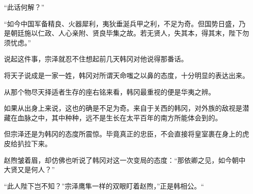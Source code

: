 “此话何解？”

“如今中国军备精良、火器犀利，夷狄垂涎兵甲之利，不足为奇。但国势日盛，乃是朝廷施以仁政、人心亲附、贤良毕集之故。若无贤人，失其本，得其末，陛下勿须忧虑。”

说起这件事，宗泽就忍不住想起前几天韩冈对他说得那番话。

将天子说成是一家一姓，韩冈对所谓天命嗤之以鼻的态度，十分明显的表达出来。

从那个物尽天择适者生存的座右铭来看，韩冈最重视的便是华夷之辨。

如果从出身上来说，这也的确是不足为奇。来自于关西的韩冈，对外族的敌视是潜藏在血脉之中，其中种种，远不是生长在太平百年的南方所能体会到的。

但宗泽还是为韩冈的态度所震惊。毕竟真正的忠臣，不会直接将皇室裹在身上的虎皮给扒拉下来。

赵煦皱着眉，却仿佛也听说了韩冈对这一次变局的态度：“那依卿之见，如今朝中大贤又是何人？”

“此人陛下岂不知？”宗泽鹰隼一样的双眼盯着赵煦，”正是韩相公。“
